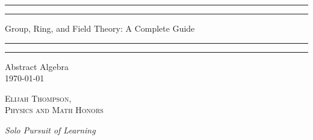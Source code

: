 \documentclass[12pt, a4paper, oneside, openright, titlepage]{book}
\begin{document}

\begin{titlepage}
    \centering
    \scshape
    \vspace*{\baselineskip}
    \rule{\textwidth}{1.6pt}\vspace*{-\baselineskip}\vspace*{2pt}
    \rule{\textwidth}{0.4pt}
    
    \vspace{0.75\baselineskip}
    
    {\LARGE Group, Ring, and Field Theory: A Complete Guide}
    
    \vspace{0.75\baselineskip}
    
    \rule{\textwidth}{0.4pt}\vspace*{-\baselineskip}\vspace{3.2pt}
    \rule{\textwidth}{1.6pt}
    
    \vspace{2\baselineskip}
    Abstract Algebra \\
    \vspace*{3\baselineskip}
    \monthdayyeardate\today \\
    \vspace*{5.0\baselineskip}
    
    {\scshape\Large Elijah Thompson, \\ Physics and Math Honors\\}
    
    \vspace{1.0\baselineskip}
    \textit{Solo Pursuit of Learning}
    \vfill
    \enlargethispage{1in}
    \begin{figure}[b!]
    \end{figure}
\end{titlepage}
\end{document}
